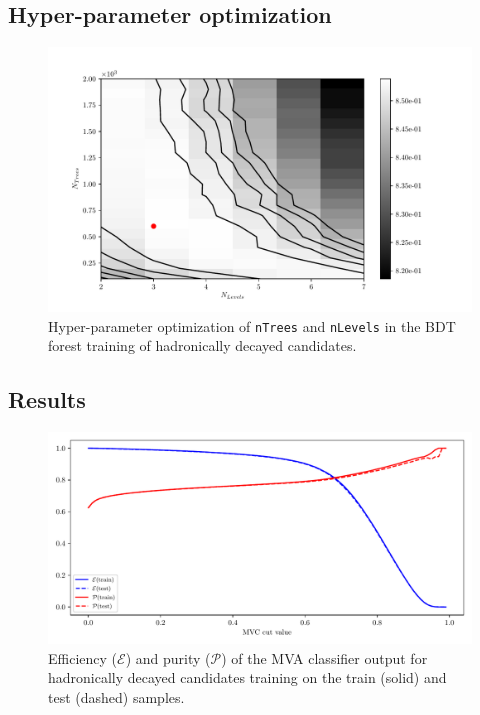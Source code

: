\subsection*{Hyper-parameter optimization}

\begin{figure}[H]
\centering
\captionsetup{width=0.8\linewidth}
\includegraphics[width=\linewidth]{fig/addendums/HD_hpo}
\caption{Hyper-parameter optimization of \texttt{nTrees} and \texttt{nLevels} in the BDT forest training of hadronically decayed candidates.}
\end{figure}

\subsection*{Results}

\begin{figure}[H]
\centering
\captionsetup{width=0.8\linewidth}
\includegraphics[width=\linewidth]{fig/addendums/HD_effpur}
\caption{Efficiency ($\mathcal{E}$) and purity ($\mathcal{P}$) of the MVA classifier output for hadronically decayed candidates training on the train (solid) and test (dashed) samples.}
\end{figure}

